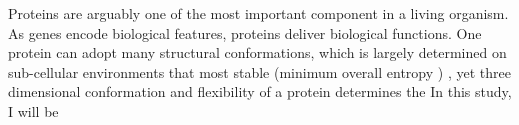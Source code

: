 Proteins are arguably one of the most important component in a living organism. As genes encode biological features, proteins deliver biological functions. One protein can adopt many structural conformations, which is largely determined on sub-cellular environments that most stable (minimum overall entropy ) , yet three dimensional conformation and flexibility of a protein determines the     In this study, I will be 